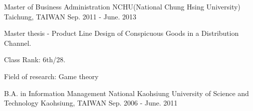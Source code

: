

\begin{cventries}

  \cventry
    {Master of Business Administration} %
    {NCHU(National Chung Hsing University)} %
    {Taichung, TAIWAN} %
    {Sep. 2011 - June. 2013} %
    {
    \vspace{+0.5cm}
      \begin{cvitems} %
        \item {Master thesis - Product Line Design of Conspicuous Goods in a Distribution Channel.}
      \end{cvitems}
      \begin{cvitems} %
        \item {Class Rank: 6th/28.}
      \end{cvitems}
      \begin{cvitems} %
        \item {Field of research: Game theory}
      \end{cvitems}
    }

  

\end{cventries}
\vspace{+0.5cm}

\begin{cventries}
  \cventry
  {B.A. in Information Management} %
  {National Kaohsiung University of Science and Technology} %
  {Kaohsiung, TAIWAN} %
  {Sep. 2006 - June. 2011} %
  {
  }

\end{cventries}